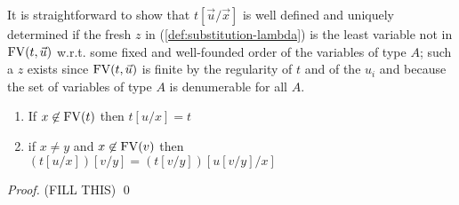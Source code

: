 It is straightforward to show that $t[\vec{u}/{\vec{x}}]$ is well defined and uniquely determined if the
fresh $z$ in (\ref{def:substitution-lambda}) is the least variable not in ${{\rm FV}}(t,\vec{u})$ w.r.t. some fixed and
well-founded order of the variables of type $A$; such a $z$ exists since ${{\rm FV}}(t,\vec{u})$ is finite by the regularity of $t$ and of the $u_i$ and
because the set of variables of type $A$ is denumerable for all $A$. 

\medskip

\begin{lemma}\label{lem:substitution-composition} 
\hfill
\begin{enumerate}
\item \label{lem:substitution-composition-1}
	If $x \not \in {{\rm FV}}(t)$ then $t[u/x] = t$
\item \label{lem:substitution-composition-2}
	if $x\neq y$ and $x \not \in {{\rm FV}}(v)$ then \\
	$(t[u/x])[v/y] = (t[v/y])[u[v/y]/x]$ 
\end{enumerate}
\end{lemma}

\begin{proof}
  (FILL THIS) \qed
\end{proof}